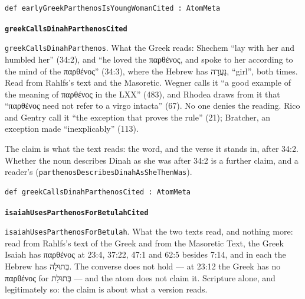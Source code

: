 \documentclass[11pt]{article}
\begin{document}
{\small\begin{verbatim}
def earlyGreekParthenosIsYoungWomanCited : AtomMeta
\end{verbatim}}
\par\medskip\noindent\textbf{\texttt{greek\allowbreak{}Calls\allowbreak{}Dinah\allowbreak{}Parthenos\allowbreak{}Cited}}\par\nobreak\noindent
\texttt{greek\allowbreak{}Calls\allowbreak{}Dinah\allowbreak{}Parthenos}. What the Greek reads: Shechem “lay with her and humbled her” (34:2), and “he loved the παρθένος, and spoke to her according to the mind of the παρθένος” (34:3), where the Hebrew has נַעֲרָה, “girl”, both times. Read from Rahlfs’s text and the Masoretic. Wegner calls it “a good example of the meaning of παρθένος in the LXX” (483), and Rhodea draws from it that “παρθένος need not refer to a virgo intacta” (67). No one denies the reading. Rico and Gentry call it “the exception that proves the rule” (21); Bratcher, an exception made “inexplicably” (113).

The claim is what the text reads: the word, and the verse it stands in, after 34:2. Whether the noun describes Dinah as she was after 34:2 is a further claim, and a reader’s (\texttt{parthenos\allowbreak{}Describes\allowbreak{}Dinah\allowbreak{}As\allowbreak{}She\allowbreak{}Then\allowbreak{}Was}).

{\small\begin{verbatim}
def greekCallsDinahParthenosCited : AtomMeta
\end{verbatim}}
\par\medskip\noindent\textbf{\texttt{isaiah\allowbreak{}Uses\allowbreak{}Parthenos\allowbreak{}For\allowbreak{}Betulah\allowbreak{}Cited}}\par\nobreak\noindent
\texttt{isaiah\allowbreak{}Uses\allowbreak{}Parthenos\allowbreak{}For\allowbreak{}Betulah}. What the two texts read, and nothing more: read from Rahlfs’s text of the Greek and from the Masoretic Text, the Greek Isaiah has παρθένος at 23:4, 37:22, 47:1 and 62:5 besides 7:14, and in each the Hebrew has בְּתוּלָה. The converse does not hold — at 23:12 the Greek has no παρθένος for בְּתוּלַת — and the atom does not claim it. Scripture alone, and legitimately so: the claim is about what a version reads.
\end{document}
